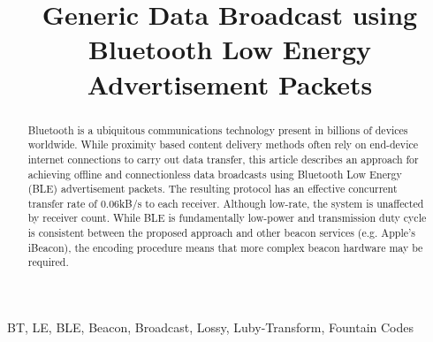 \documentclass[conference]{IEEEtran} %
\begin{document}
\title{Generic Data Broadcast using Bluetooth Low Energy Advertisement Packets\\
}

\author{
\and
{}
}
\maketitle

\begin{abstract}
Bluetooth is a ubiquitous communications technology present in billions of devices worldwide. While proximity based content delivery methods often rely on end-device internet connections to carry out data transfer, this article describes an approach for achieving offline and connectionless data broadcasts using Bluetooth Low Energy (BLE) advertisement packets. The resulting protocol has an effective concurrent transfer rate of 0.06kB/s to each receiver. Although low-rate, the system is unaffected by receiver count. While BLE is fundamentally low-power and transmission duty cycle is consistent between the proposed approach and other beacon services (e.g. Apple's iBeacon), the encoding procedure means that more complex beacon hardware may be required.
\end{abstract}

\begin{IEEEkeywords}
BT, LE, BLE, Beacon, Broadcast, Lossy, Luby-Transform, Fountain Codes
\end{IEEEkeywords}
\end{document}
